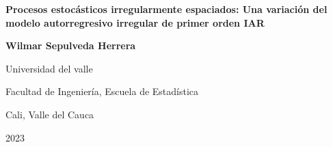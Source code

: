 \thispagestyle{empty}

\begin{center}
\begin{figure}
\centering
{}
\end{figure}\vspace*{1.5cm}

\textbf{\huge Procesos estocásticos irregularmente espaciados: Una variación del modelo autorregresivo irregular de primer orden IAR}\vspace*{3.5cm}

\Large\textbf{Wilmar Sepulveda Herrera}\vspace*{3.5cm}

\small Universidad del valle

Facultad de Ingeniería, Escuela de Estadística

Cali, Valle del Cauca

2023
\end{center}

\newpage{\pagestyle{empty}\cleardoublepage}

\newpage

\thispagestyle{empty}

